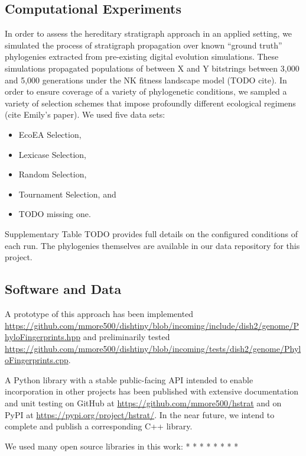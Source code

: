 \subsection{Computational Experiments}

In order to assess the hereditary stratigraph approach in an applied setting, we simulated the process of stratigraph propagation over known ``ground truth'' phylogenies extracted from pre-existing digital evolution simulations.
These simulations propagated populations of between X and Y bitstrings between 3,000 and 5,000 generations under the NK fitness landscape model (TODO cite).
In order to ensure coverage of a variety of phylogenetic conditions, we sampled a variety of selection schemes that impose profoundly different ecological regimens (cite Emily's paper).
We used five data sets:
\begin{itemize}
  \item EcoEA Selection,
  \item Lexicase Selection,
  \item Random Selection,
  \item Tournament Selection, and
  \item TODO missing one.
\end{itemize}

Supplementary Table TODO provides full details on the configured conditions of each run.
The phylogenies themselves are available in our data repository for this project.


\subsection{Software and Data}

A prototype of this approach has been implemented \url{https://github.com/mmore500/dishtiny/blob/incoming/include/dish2/genome/PhyloFingerprints.hpp} and preliminarily tested \url{https://github.com/mmore500/dishtiny/blob/incoming/tests/dish2/genome/PhyloFingerprints.cpp}.

A Python library with a stable public-facing API intended to enable incorporation in other projects has been published with extensive documentation and unit testing on GitHub at \url{https://github.com/mmore500/hstrat} and on PyPI at \url{https://pypi.org/project/hstrat/}.
In the near future, we intend to complete and publish a corresponding C++ library.

We used many open source libraries in this work:
* \citep{sukumaran2010dendropy}
* \citep{cock2009biopython}
* \citep{virtanen2020scipy}
* \citep{hunter2007matplotlib}
* \citep{virtanen2020scipy}
* \citep{waskom2021seaborn}
* \citep{bostock2011d3}
* \citep{lalejini2019data}

